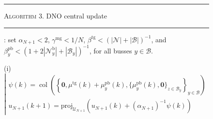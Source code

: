 \documentclass{IEEEtran}  %
\newcommand{\mc}{\mathcal}
\newcommand{\proj}{\mathrm{proj}}
\newcommand{\col}{\operatorname{col}}
\newcommand{\0}{\mathbf{0}}
\newcommand{\1}{\mathbf{1}}
\begin{document}
\begin{figure}[t]
{
\begin{minipage}{\columnwidth}
\hrule
\smallskip
\textsc{Algorithm 3}. DNO central update
\smallskip
\hrule 
\smallskip

: set $\alpha_{N+1} <2$, $\gamma^{\text{mg}} < 1/N$, $\beta^{\text{tg}} < (|\mc N| \!+\! |\mc B|)^{-1}$, and $\beta_y^{\text{pb}} < (1\!+\!2|\mc N_y^{\mathrm{b}}|\!+\!|\mc B_y|)^{-1}$,  for all busses $y\!\in\! \mc B $.

\medskip
\noindent 
(i) \\[.2em]
\hspace*{.15em}
$\left|
\begin{array}{l}
\psi(k) = \col \left( 
	\left\{
	\0,\mu^{\text{tg}}(k) + \mu_y^{\text{pb}}(k), 
	\{ \mu_y^{\text{pb}}(k), \0 \}_{z \in \mc B_y}
	\right\}_{y \in \mc B} \right)\\[.7em]
%
u_{N+1}(k+1) = \proj_{\mc U_{N+1}}  \left( u_{N+1}(k) + (\alpha_{N+1})^{-1} \psi(k) \right)
\end{array}
\right.
$


\end{minipage}}
\end{figure}
\end{document}
